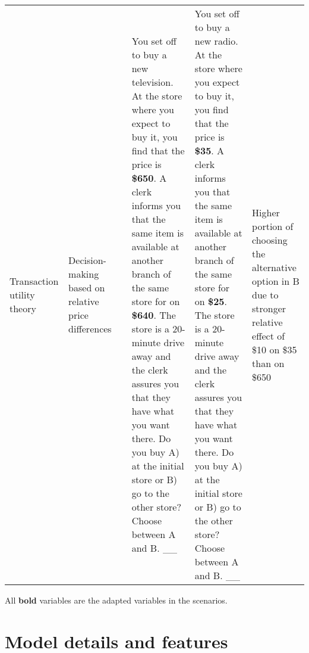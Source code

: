 \begin{small}
\begin{longtable}[c]{p{2cm}p{1.5cm}p{1.5cm}p{3.5cm}p{3.5cm}p{2cm}}
    Transaction utility theory & Decision-making based on relative price differences & \textcite{thaler1983transaction} & You set off to buy a new television. At the store where you expect to buy it, you find that the price is \textbf{\$650}. A clerk informs you that the same item is available at another branch of the same store for on \textbf{\$640}. The store is a 20-minute drive away and the clerk assures you that they have what you want there. Do you buy A) at the initial store or B) go to the other store? Choose between A and B. \_\_ & You set off to buy a new radio. At the store where you expect to buy it, you find that the price is \textbf{\$35}. A clerk informs you that the same item is available at another branch of the same store for on \textbf{\$25}. The store is a 20-minute drive away and the clerk assures you that they have what you want there. Do you buy A) at the initial store or B) go to the other store? Choose between A and B. \_\_ & Higher portion of choosing the alternative option in B due to stronger relative effect of \$10 on \$35 than on \$650 \\
\end{longtable}
\end{small}

\par All \textbf{bold} variables are the adapted variables in the scenarios.



\newpage
\section{Model details and features}
\label{appendix:models}


